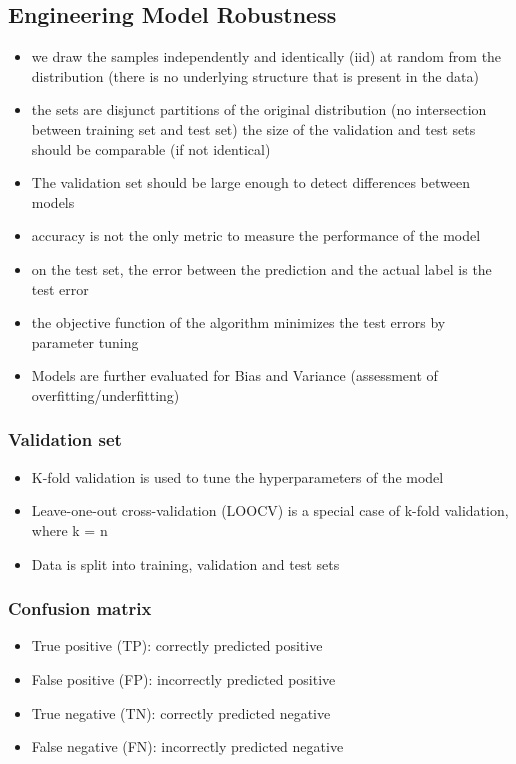 \documentclass[12pt,a4paper]{article}
\begin{document}
\subsection{Engineering Model Robustness}
\begin{itemize}
    \item we draw the samples independently and identically (iid) at random from the distribution
    (there is no underlying structure that is present in the data)
    \item the sets are disjunct partitions of the original distribution
    (no intersection between training set and test set)
    the size of the validation and test sets should be comparable (if not identical)
    \item The validation set should be large enough to detect differences between models
    \item accuracy is not the only metric to measure the performance of the model
    \item  on the test set, the error between the prediction and the actual label is the test error
    \item the objective function of the algorithm minimizes the test errors by parameter tuning
    \item Models are further evaluated for Bias and Variance (assessment of overfitting/underfitting)
\end{itemize}
\subsubsection{Validation set}
\begin{itemize}
    \item K-fold validation is used to tune the hyperparameters of the model
    \item Leave-one-out cross-validation (LOOCV) is a special case of k-fold validation, where k = n
    \item Data is split into training, validation and test sets
\end{itemize}
\subsubsection{Confusion matrix}
\begin{itemize}
    \item True positive (TP): correctly predicted positive
    \item False positive (FP): incorrectly predicted positive
    \item True negative (TN): correctly predicted negative
    \item False negative (FN): incorrectly predicted negative
\end{itemize}
\end{document}
